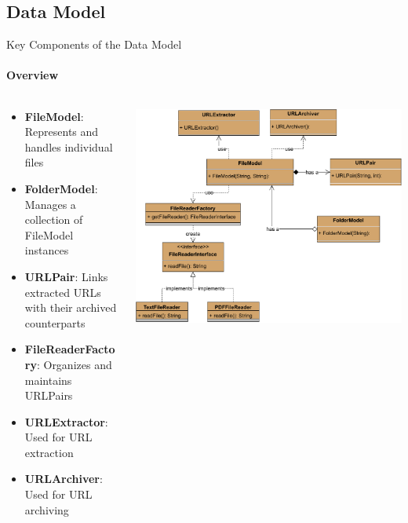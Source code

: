 \documentclass[
    ngerman,%
    authorontitle=true,
]{bfhbeamer}
\begin{document}
    \subsection{Data Model}
    \begin{frame}{Key Components of the Data Model}
        \framesubtitle{Overview}
        \begin{columns} %
            \begin{column}{0.5\textwidth} %
                \begin{itemize}
                    \item \textbf{FileModel}: Represents and handles individual files
                    \item \textbf{FolderModel}: Manages a collection of FileModel instances
                    \item \textbf{URLPair}: Links extracted URLs with their archived counterparts
                    \item \textbf{FileReaderFactory}: Organizes and maintains URLPairs
                    \item \textbf{URLExtractor}: Used for URL extraction
                    \item \textbf{URLArchiver}: Used for URL archiving
                \end{itemize}
            \end{column}
            \begin{column}{0.5\textwidth} %
                \includegraphics[width=1\textwidth]{figures/URL_Archiver_Class_Diagram-DataModel}

\end{column}
\end{columns}
\end{frame}
\end{document}
